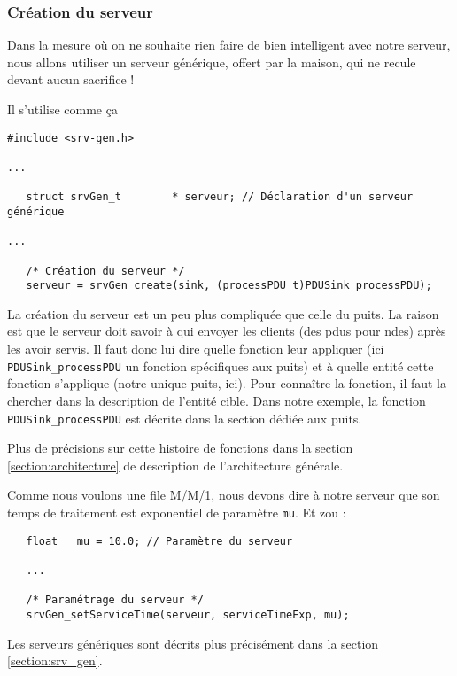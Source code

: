 \subsubsection{Création du serveur}

   Dans la mesure où on ne souhaite rien faire de bien intelligent
avec notre serveur, nous allons utiliser un serveur générique, offert
par la maison, qui ne recule devant aucun sacrifice !

   Il s'utilise comme ça 

\begin{verbatim}
#include <srv-gen.h>

...

   struct srvGen_t        * serveur; // Déclaration d'un serveur générique

...

   /* Création du serveur */
   serveur = srvGen_create(sink, (processPDU_t)PDUSink_processPDU);
\end{verbatim}

   La création du serveur est un peu plus compliquée que celle du
puits. La raison est que le serveur doit savoir à qui envoyer les
clients (des {\sc pdu}s pour {\sc ndes}) après les avoir servis. Il
faut donc lui dire quelle fonction leur appliquer (ici {\tt
  PDUSink\_processPDU} un fonction spécifiques aux puits) et à quelle
entité cette fonction s'applique (notre unique puits, ici). Pour
connaître   la fonction, il faut la chercher dans la description de
l'entité cible. Dans notre exemple, la fonction {\tt
  PDUSink\_processPDU} est décrite dans la section dédiée aux puits.

   Plus de précisions sur cette histoire de fonctions dans la section
\ref{section:architecture} de description de l'architecture générale.

   Comme nous voulons une file M/M/1, nous devons dire à notre serveur
que son temps de traitement est exponentiel de paramètre {\tt mu}. Et
zou :

\begin{verbatim}
   float   mu = 10.0; // Paramètre du serveur

   ...

   /* Paramétrage du serveur */
   srvGen_setServiceTime(serveur, serviceTimeExp, mu);
\end{verbatim}

   Les serveurs génériques sont décrits plus précisément dans la
section \ref{section:srv_gen}.

%
